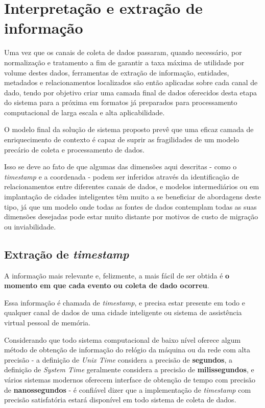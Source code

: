 \section{Interpretação e extração de informação} \label{s:interpretacao_e_extracao_de_informacao}

Uma vez que os canais de coleta de dados passaram, quando necessário, por normalização e tratamento a fim de garantir a taxa máxima de utilidade por volume destes dados, ferramentas de extração de informação, entidades, metadados e relacionamentos localizados são então aplicadas sobre cada canal de dado, tendo por objetivo criar uma camada final de dados oferecidos desta etapa do sistema para a próxima em formatos já preparados para processamento computacional de larga escala e alta aplicabilidade.

 O modelo final da solução de sistema proposto prevê que uma eficaz camada de enriquecimento de contexto é capaz de suprir as fragilidades de um modelo precário de coleta e processamento de dados.
 
 Isso se deve ao fato de que algumas das dimensões aqui descritas - como o \textit{timestamp} e a coordenada - podem ser inferidos através da identificação de relacionamentos entre diferentes canais de dados, e modelos intermediários ou em implantação de cidades inteligentes têm muito a se beneficiar de abordagens deste tipo, já que um modelo onde todas as fontes de dados contemplam todas as suas dimensões desejadas pode estar muito distante por motivos de custo de migração ou inviabilidade.

\subsection{Extração de \textit{timestamp}} \label{ss:extracao_de_timestamp}

A informação mais relevante e, felizmente, a mais fácil de ser obtida é \textbf{o momento em que cada evento ou coleta de dado ocorreu}. 

Essa informação é chamada de \textit{timestamp}, e precisa estar presente em todo e qualquer canal de dados de uma cidade inteligente ou sistema de assistência virtual pessoal de memória. 

Considerando que todo sistema computacional de baixo nível oferece algum método de obtenção de informação do relógio da máquina ou da rede com alta precisão - a definição de \textit{Unix Time} considera a precisão de \textbf{segundos}, a definição de \textit{System Time} geralmente considera a precisão de \textbf{milissegundos}, e vários sistemas modernos oferecem interface de obtenção de tempo com precisão de \textbf{nanossegundos} - é confiável dizer que a implementação de \textit{timestamp} com precisão satisfatória estará disponível em todo sistema de coleta de dados.


